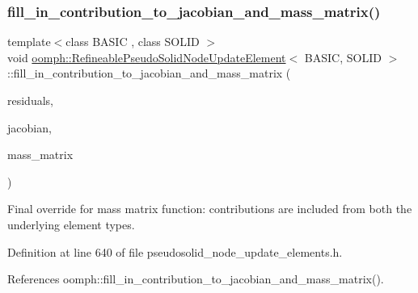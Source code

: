 \subsubsection{\texorpdfstring{fill\+\_\+in\+\_\+contribution\+\_\+to\+\_\+jacobian\+\_\+and\+\_\+mass\+\_\+matrix()}{fill\_in\_contribution\_to\_jacobian\_and\_mass\_matrix()}}
{\footnotesize\ttfamily template$<$class B\+A\+S\+IC , class S\+O\+L\+ID $>$ \\
void \hyperlink{classoomph_1_1RefineablePseudoSolidNodeUpdateElement}{oomph\+::\+Refineable\+Pseudo\+Solid\+Node\+Update\+Element}$<$ B\+A\+S\+IC, S\+O\+L\+ID $>$\+::fill\+\_\+in\+\_\+contribution\+\_\+to\+\_\+jacobian\+\_\+and\+\_\+mass\+\_\+matrix (\begin{DoxyParamCaption}\item[{\hyperlink{classoomph_1_1Vector}{Vector}$<$ double $>$ \&}]{residuals,  }\item[{\hyperlink{classoomph_1_1DenseMatrix}{Dense\+Matrix}$<$ double $>$ \&}]{jacobian,  }\item[{\hyperlink{classoomph_1_1DenseMatrix}{Dense\+Matrix}$<$ double $>$ \&}]{mass\+\_\+matrix }\end{DoxyParamCaption})\hspace{0.3cm}{\ttfamily [inline]}}



Final override for mass matrix function\+: contributions are included from both the underlying element types. 



Definition at line 640 of file pseudosolid\+\_\+node\+\_\+update\+\_\+elements.\+h.



References oomph\+::fill\+\_\+in\+\_\+contribution\+\_\+to\+\_\+jacobian\+\_\+and\+\_\+mass\+\_\+matrix().

\mbox{\label{classoomph_1_1RefineablePseudoSolidNodeUpdateElement_a36add3ef201fc05954ab982a67840cb3}} 
